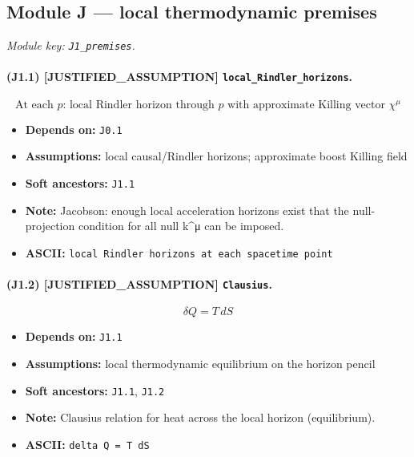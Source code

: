\documentclass[11pt,a4paper]{article}
\theoremstyle{remark}\newtheorem*{caution}{Caution}
\newcommand{\tagbox}[1]{\textsc{[#1]}}
\begin{document}
\subsection{Module J --- local thermodynamic premises}
\textit{Module key: \texttt{J1\_premises}.}
\paragraph{(J1.1) \tagbox{JUSTIFIED\_ASSUMPTION} \texttt{local\_Rindler\_horizons}.}
\begin{equation}
\text{At each }p\text{: local Rindler horizon through }p\text{ with approximate Killing vector }\chi^\mu
\tag{J1.1}
\end{equation}
\begin{itemize}\setlength{\itemsep}{0.12em}
\item \textbf{Depends on:} \texttt{J0.1}
\item \textbf{Assumptions:} local causal/Rindler horizons; approximate boost Killing field
\item \textbf{Soft ancestors:} \texttt{J1.1}
\item \textbf{Note:} Jacobson: enough local acceleration horizons exist that the null-projection condition for all null k^μ can be imposed.
\item \textbf{ASCII:} \texttt{local Rindler horizons at each spacetime point}
\end{itemize}
\paragraph{(J1.2) \tagbox{JUSTIFIED\_ASSUMPTION} \texttt{Clausius}.}
\begin{equation}
\delta Q = T\,dS
\tag{J1.2}
\end{equation}
\begin{itemize}\setlength{\itemsep}{0.12em}
\item \textbf{Depends on:} \texttt{J1.1}
\item \textbf{Assumptions:} local thermodynamic equilibrium on the horizon pencil
\item \textbf{Soft ancestors:} \texttt{J1.1}, \texttt{J1.2}
\item \textbf{Note:} Clausius relation for heat across the local horizon (equilibrium).
\item \textbf{ASCII:} \texttt{delta Q = T dS}
\end{itemize}
\end{document}
